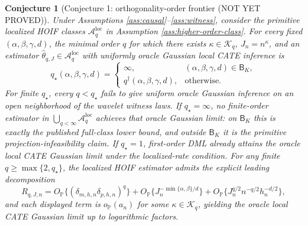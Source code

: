 \documentclass[11pt]{article}
\renewcommand{\Pr}{\mathbb{P}}
\theoremstyle{definition}
\theoremstyle{plain}
\newtheorem{conjecture}{Conjecture}
\theoremstyle{remark}
\begin{document}
\begin{conjecture}[Conjecture 1: orthogonality-order frontier (NOT YET PROVED)]\label{conj:order-frontier}
Under Assumptions \ref{ass:causal}--\ref{ass:witness}, consider the primitive
localized HOIF classes \(\mathcal A_q^{\mathrm{loc}}\) in Assumption
\ref{ass:higher-order-class}.  For every fixed
\((\alpha,\beta,\gamma,d)\), the minimal order \(q\) for which there exists
\(\kappa\in\mathcal K_q\), \(J_n=n^\kappa\), and an estimator
\(\hat\theta_{q,J}\in\mathcal A_q^{\mathrm{loc}}\) with uniformly oracle
Gaussian local CATE inference is
\[
q_\star(\alpha,\beta,\gamma,d)=
\begin{cases}
\infty,&(\alpha,\beta,\gamma,d)\in\mathsf B_K,\\
q^\dagger(\alpha,\beta,\gamma,d),&\text{otherwise}.
\end{cases}
\]
For finite \(q_\star\), every \(q<q_\star\) fails to give uniform oracle
Gaussian inference on an open neighborhood of the wavelet witness laws.  If
\(q_\star=\infty\), no finite-order estimator in
\(\bigcup_{q<\infty}\mathcal A_q^{\mathrm{loc}}\) achieves that oracle
Gaussian limit: on \(\mathsf B_K\) this is exactly the published full-class
lower bound, and outside \(\mathsf B_K\) it is the primitive
projection-infeasibility claim.  If \(q_\star=1\), first-order DML already
attains the oracle local CATE Gaussian limit under the localized-rate
condition.  For any finite
\(q\ge\max\{2,q_\star\}\), the localized HOIF estimator
admits the explicit leading decomposition
\[
R_{q,J,n}=O_{\Pr}\{(\delta_{m,h,n}\delta_{p,h,n})^q\}
 +O_{\Pr}\{J_n^{-\min\{\alpha,\beta\}/d}\}
 +O_{\Pr}\{J_n^{q/2}n^{-q/2}h_n^{-d/2}\},
\]
and each displayed term is \(o_{\Pr}(a_n)\) for some
\(\kappa\in\mathcal K_q\), yielding the oracle local CATE Gaussian limit up to
logarithmic factors.
\end{conjecture}
\end{document}
